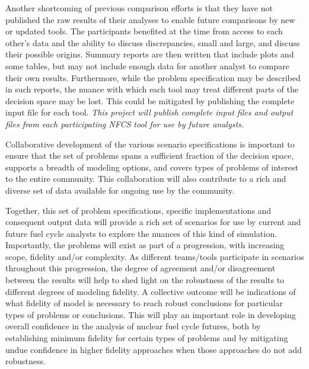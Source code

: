 Another shortcoming of previous comparison efforts is that they have not
published the raw results of their analyses to enable future comparisons by
new or updated tools.  The participants benefited at the time from access to
each other's data and the ability to discuss discrepancies, small and large,
and discuss their possible origins.  Summary reports are then written that
include plots and some tables, but may not include enough data for another
analyst to compare their own results.  Furthermore, while the problem
specification may be described in such reports, the nuance with which each
tool may treat different parts of the decision space may be lost.  This could
be mitigated by publishing the complete input file for each tool.  \emph{This
  project will publish complete input files and output files from each
  participating \gls{NFCS} tool for use by future analysts.}

Collaborative development of the various scenario specifications is important
to ensure that the set of problems spans a sufficient fraction of the decision
space, supports a breadth of modeling options, and covers types of problems of
interest to the entire community.  This collaboration will also contribute to
a rich and diverse set of data available for ongoing use by the community.

Together, this set of problem specifications, specific implementations and
consequent output data will provide a rich set of scenarios for use by current
and future fuel cycle analysts to explore the nuances of this kind of
simulation.  Importantly, the problems will exist as part of a progression,
with increasing scope, fidelity and/or complexity.  As different teams/tools
participate in scenarios throughout this progression, the degree of agreement
and/or disagreement between the results will help to shed light on the
robustness of the results to different degrees of modeling fidelity.  A
collective outcome will be indications of what fidelity of model is necessary
to reach robust conclusions for particular types of problems or conclusions.
This will play an important role in developing overall confidence in the
analysis of nuclear fuel cycle futures, both by establishing minimum
fidelity for certain types of problems and by mitigating undue confidence in
higher fidelity approaches when those approaches do not add robustness.

